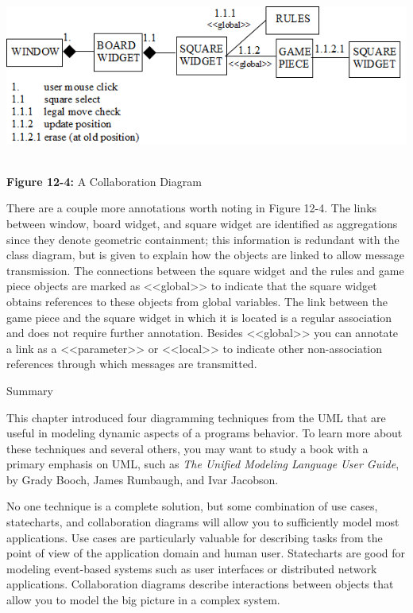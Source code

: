 \bigskip

\includegraphics[width=5.8in,height=2.2in]{ub-img/collabor.png}

{\sffamily\bfseries Figure 12-4:}
{\sffamily A Collaboration Diagram}

\bigskip

There are a couple more annotations worth noting in Figure 12-4. The
links between window, board widget, and square widget are identified as
aggregations since they denote geometric containment; this information
is redundant with the class diagram, but is given to explain how the
objects are linked to allow message transmission. The connections
between the square widget and the rules and game piece objects are
marked as {\textless}{\textless}global{\textgreater}{\textgreater} to
indicate that the square widget obtains references to these objects
from global variables. The link between the game piece and the square
widget in which it is located is a regular association and does not
require further annotation. Besides
{\textless}{\textless}global{\textgreater}{\textgreater} you can
annotate a link as a
{\textless}{\textless}parameter{\textgreater}{\textgreater} or
{\textless}{\textless}local{\textgreater}{\textgreater} to indicate
other non-association references through which messages are
transmitted.

{\sffamily
Summary}

This chapter introduced four diagramming techniques from the UML that
are useful in modeling dynamic aspects of a program{\textquotesingle}s
behavior. To learn more about these techniques and several others, you
may want to study a book with a primary emphasis on UML, such as
\textit{The Unified Modeling Language User Guide}, by Grady Booch,
James Rumbaugh, and Ivar Jacobson.

No one technique is a complete solution, but some combination of use
cases, statecharts, and collaboration diagrams will allow you to
sufficiently model most applications. Use cases are particularly
valuable for describing tasks from the point of view of the application
domain and human user. Statecharts are good for modeling event-based
systems such as user interfaces or distributed network applications.
Collaboration diagrams describe interactions between objects that allow
you to model the big picture in a complex system.

